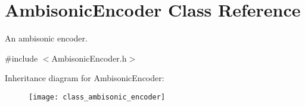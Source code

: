 \hypertarget{class_ambisonic_encoder}{\section{Ambisonic\-Encoder Class Reference}
\label{class_ambisonic_encoder}
}


An ambisonic encoder.  




{\ttfamily \#include $<$Ambisonic\-Encoder.\-h$>$}

Inheritance diagram for Ambisonic\-Encoder\-:\begin{figure}[H]
\begin{center}
\leavevmode
\texttt{[image: class\_ambisonic\_encoder]}
\end{center}
\end{figure}

